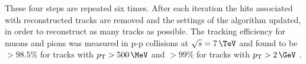 These four steps are repeated six times. After each iteration
the hits associated with reconstructed tracks are removed and the settings
of the algorithm updated, in order to reconstruct as many
tracks as possible. The tracking efficiency for muons and pions was measured in p-p
collisions at $\sqrt{s} = 7\,\TeV$ and found to be $ > 98.5\%$ for tracks
with $\pTm > 500\,\MeV$ and $ > 99 \%$ for tracks with $\pTm > 2\,\GeV$ \cite{cms-trk-7tev}.

